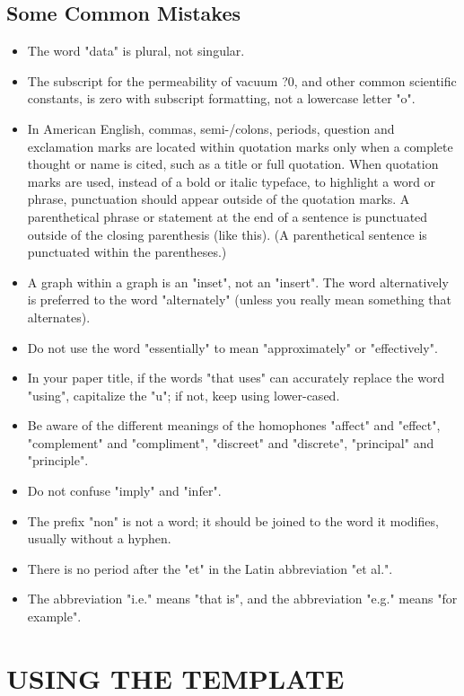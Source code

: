 \documentclass[letterpaper, 10 pt, conference]{ieeeconf}  %
\begin{document}
\subsection{Some Common Mistakes}
\begin{itemize}


\item The word "data" is plural, not singular.
\item The subscript for the permeability of vacuum ?0, and other common scientific constants, is zero with subscript formatting, not a lowercase letter "o".
\item In American English, commas, semi-/colons, periods, question and exclamation marks are located within quotation marks only when a complete thought or name is cited, such as a title or full quotation. When quotation marks are used, instead of a bold or italic typeface, to highlight a word or phrase, punctuation should appear outside of the quotation marks. A parenthetical phrase or statement at the end of a sentence is punctuated outside of the closing parenthesis (like this). (A parenthetical sentence is punctuated within the parentheses.)
\item A graph within a graph is an "inset", not an "insert". The word alternatively is preferred to the word "alternately" (unless you really mean something that alternates).
\item Do not use the word "essentially" to mean "approximately" or "effectively".
\item In your paper title, if the words "that uses" can accurately replace the word "using", capitalize the "u"; if not, keep using lower-cased.
\item Be aware of the different meanings of the homophones "affect" and "effect", "complement" and "compliment", "discreet" and "discrete", "principal" and "principle".
\item Do not confuse "imply" and "infer".
\item The prefix "non" is not a word; it should be joined to the word it modifies, usually without a hyphen.
\item There is no period after the "et" in the Latin abbreviation "et al.".
\item The abbreviation "i.e." means "that is", and the abbreviation "e.g." means "for example".

\end{itemize}


\section{USING THE TEMPLATE}
\end{document}
